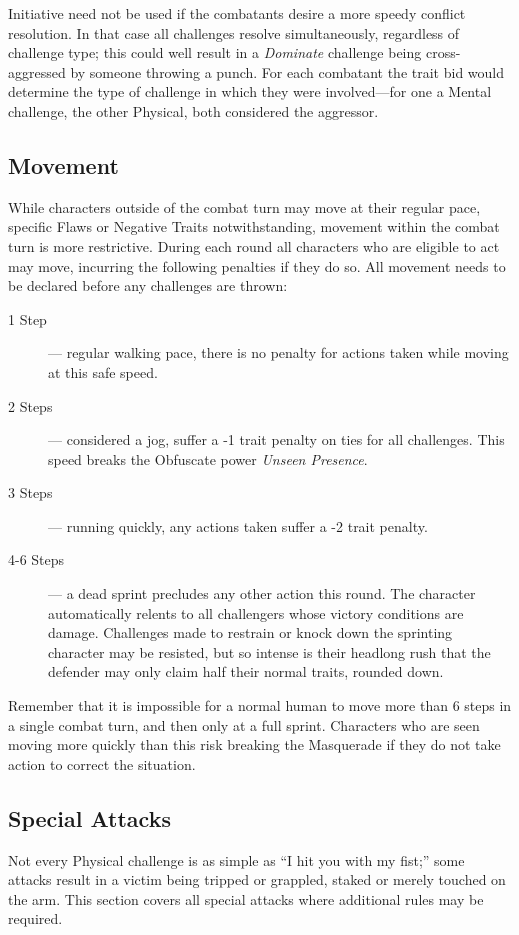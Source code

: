 Initiative need not be used if the combatants desire a more speedy conflict resolution.  
In that case all challenges resolve simultaneously, regardless of challenge type; this could 
well result in a \emph{Dominate} challenge being cross-aggressed by someone throwing a punch.  
For each combatant the trait bid would determine the type of challenge in which they 
were involved---for one a Mental challenge, the other Physical, both considered the aggressor.

\subsection{Movement}
While characters outside of the combat turn may move at their regular pace, specific Flaws 
or Negative Traits notwithstanding, movement within the combat turn is more restrictive.  During 
each round all characters who are eligible to act may move, incurring the following penalties if 
they do so.  All movement needs to be declared before any challenges are thrown:

\begin{description}
	\item[1 Step]--- regular walking pace, there is no penalty for actions taken while 
	moving at this safe speed.
	\item[2 Steps]--- considered a jog, suffer a -1 trait penalty on ties for all 
	challenges.  This speed breaks the Obfuscate power \emph{Unseen Presence}.
	\item[3 Steps]--- running quickly, any actions taken suffer a -2 trait penalty.
	\item[4-6 Steps]--- a dead sprint precludes any other action this round.  The 
	character automatically relents to all challengers whose victory conditions are damage.  
	Challenges made to restrain or knock down the sprinting character may be resisted, but 
	so intense is their headlong rush that the defender may only claim half their normal traits, 
	rounded down.
\end{description}

\noindent Remember that it is impossible for a normal human to move more than 6 steps in a single 
combat turn, and then only at a full sprint.  Characters who are seen moving more quickly than this 
risk breaking the Masquerade if they do not take action to correct the situation.

\subsection{Special Attacks}
Not every Physical challenge is as simple as ``I hit you with my fist;'' some attacks result in a 
victim being tripped or grappled, staked or merely touched on the arm.  This section covers all 
special attacks where additional rules may be required.

